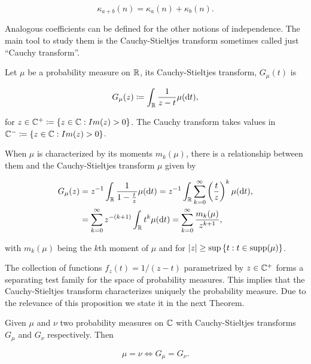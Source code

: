     \begin{equation*}
        \kappa_{a+b}(n) = \kappa_a(n) + \kappa_b(n).
    \end{equation*}

    Analogous coefficients can be defined for the other notions of independence. The main tool to study them is the Cauchy-Stieltjes transform sometimes called just ``Cauchy transform''.

    \begin{definition}
        Let $\mu$ be a probability measure on $\mathbb R$, its Cauchy-Stieltjes transform, $G_\mu(t)$ is

        \begin{equation*}
            G_\mu(z) \coloneqq \int_\mathbb R \frac{1}{z-t} \mu(\mathrm d t),
        \end{equation*}

        \noindent for $z \in \mathbb C^+ \coloneqq \{ z \in\mathbb C : Im(z) >0 \}$. The Cauchy transform takes values in $\mathbb C^- \coloneqq \{ z \in\mathbb C : Im(z) >0 \}$.
    \end{definition}

    When $\mu$ is characterized by its moments $m_k(\mu)$, there is a relationship between them and the Cauchy-Stieltjes transform $\mu$ given by 

    \begin{align*}
        G_\mu(z) &= z^{-1} \int_\mathbb R \frac{1}{1 - \frac tz} \mu(\mathrm d t) = z^{-1} \int_\mathbb R \sum_{k=0}^\infty \left( \frac tz \right)^k \mu(\mathrm d t),\\  
        &= \sum_{k=0}^\infty z^{-(k+1)} \int_\mathbb R t^k \mu(\mathrm d t) = \sum_{k=0}^\infty \frac{m_k(\mu)}{z^{k+1}},
    \end{align*}

    \noindent with $m_k(\mu)$ being the $k$th moment of $\mu$ and for $\lvert z \rvert \ge \sup \left\{ t : t \in \mathrm{supp} (\mu) \right\}$.

    The collection of functions $f_z(t) = 1/(z-t)$ parametrized by $z\in \mathbb C^+$ forms a separating test family for the space of probability measures. This implies that the Cauchy-Stieltjes transform characterizes uniquely the probability measure. Due to the relevance of this proposition we state it in the next Theorem.

    \begin{theorem}
        Given $\mu$ and $\nu$ two probability measures on $\mathbb C$ with Cauchy-Stieltjes transforms $G_\mu$ and $G_\nu$ respectively. Then

        \begin{equation*}
            \mu = \nu \Leftrightarrow G_\mu = G_\nu.
        \end{equation*}
    \end{theorem}

